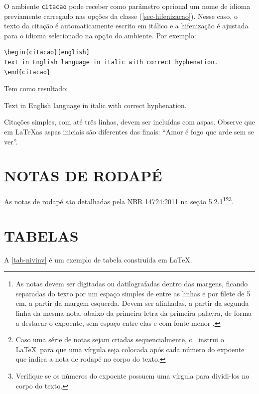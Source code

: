 O ambiente \texttt{citacao} pode receber como parâmetro opcional um nome de
idioma previamente carregado nas opções da classe (\autoref{sec-hifenizacao}). Nesse
caso, o texto da citação é automaticamente escrito em itálico e a hifenização é
ajustada para o idioma selecionado na opção do ambiente. Por exemplo:

\begin{verbatim}
\begin{citacao}[english]
Text in English language in italic with correct hyphenation.
\end{citacao}
\end{verbatim}

Tem como resultado:

\begin{citacao}[english]
Text in English language in italic with correct hyphenation.
\end{citacao}

Citações simples, com até três linhas, devem ser
incluídas com aspas. Observe que em \LaTeX as aspas iniciais são diferentes das
finais: ``Amor é fogo que arde sem se ver''.

\section{\uppercase{Notas de rodapé}}

As notas de rodapé são detalhadas pela NBR 14724:2011 na seção 5.2.1\footnote{As
notas devem ser digitadas ou datilografadas dentro das margens, ficando
separadas do texto por um espaço simples de entre as linhas e por filete de 5
cm, a partir da margem esquerda. Devem ser alinhadas, a partir da segunda linha
da mesma nota, abaixo da primeira letra da primeira palavra, de forma a destacar
o expoente, sem espaço entre elas e com fonte menor
.}\footnote{Caso uma série de notas sejam
criadas sequencialmente, o \abnTeX\ instrui o \LaTeX\ para que uma vírgula seja
colocada após cada número do expoente que indica a nota de rodapé no corpo do
texto.}\footnote{Verifique se os números do expoente possuem uma vírgula para
dividi-los no corpo do texto.}. 


\section{\uppercase{Tabelas}}

A \autoref{tab-nivinv} é um exemplo de tabela construída em
\LaTeX.

